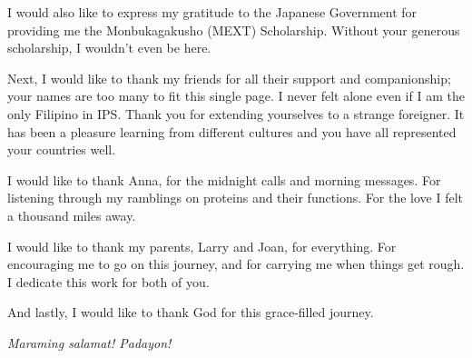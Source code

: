 \par I would also like to express my gratitude to the Japanese Government for
providing me the Monbukagakusho (MEXT) Scholarship. Without your generous
scholarship, I wouldn't even be here.

\par Next, I would like to thank my friends for all their support and
companionship; your names are too many to fit this single page.  I never felt
alone even if I am the only Filipino in IPS. Thank you for extending
yourselves to a strange foreigner. It has been a pleasure learning from
different cultures and you have all represented your countries well.

\par I would like to thank Anna, for the midnight calls and morning messages.
For listening through my ramblings on proteins and their functions.  For the
love I felt a thousand miles away.

\par I would like to thank my parents, Larry and Joan, for everything. For
encouraging me to go on this journey, and for carrying me when things get
rough. I dedicate this work for both of you.

\par And lastly, I would like to thank God for this grace-filled journey.

\vspace{5ex}
\textit{Maraming salamat! Padayon!}
